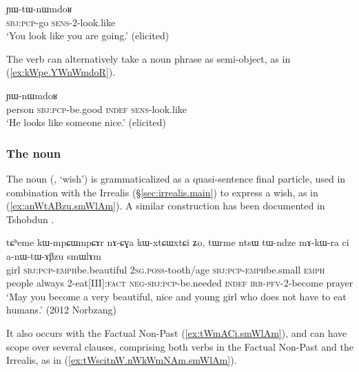 \begin{exe}
	\ex \label{ex:kWCe.YWtWnWmdoR}
	\gll [kɯ-ɕe] ɲɯ-tɯ-nɯmdoʁ \\
	\textsc{sbj}:\textsc{pcp}-go \textsc{sens}-2-look.like \\
	\glt `You look like you are going.' (elicited)
\end{exe}  

The verb  can alternatively take a noun phrase as semi-object, as in (\ref{ex:kWpe.YWnWmdoR}).


\begin{exe}
	\ex \label{ex:kWpe.YWnWmdoR}
	\gll [tɯrme kɯ-pe ci] ɲɯ-nɯmdoʁ \\
	person \textsc{sbj}:\textsc{pcp}-be.good \textsc{indef} \textsc{sens}-look.like \\
	\glt `He looks like someone nice.' (elicited)
\end{exe}  



\subsubsection{The noun  } \label{sec:smWlAm.TAME}
The noun  (, `wish') is grammaticalized as a quasi-sentence final particle, used in combination with the Irrealis (§\ref{sec:irrealis.main}) to express a wish, as in (\ref{ex:anWtABzu.smWlAm}). A similar construction has been documented in Tshobdun \citep{jackson07irrealis}.

\begin{exe}
	\ex \label{ex:anWtABzu.smWlAm}
	\gll tɕʰeme kɯ-mpɕɯ\redp{}mpɕɤr nɤ-ɕɣa kɯ-xtɕɯ\redp{}xtɕi ʑo, tɯrme ntsɯ tɯ-ndze mɤ-kɯ-ra ci a-nɯ-tɯ-ɤβzu smɯlɤm \\
	girl \textsc{sbj}:\textsc{pcp}-\textsc{emph}\redp{}be.beautiful   \textsc{2sg}.\textsc{poss}-tooth/age  \textsc{sbj}:\textsc{pcp}-\textsc{emph}\redp{}be.small \textsc{emph}  people always 2-eat[III]:\textsc{fact} \textsc{neg}-\textsc{sbj}:\textsc{pcp}-be.needed \textsc{indef} \textsc{irr}-\textsc{pfv}-2-become prayer \\
	\glt `May you become a very beautiful, nice and young girl who does not have to eat humans.' (2012 Norbzang)
\end{exe}

It also occurs with the Factual Non-Past (\ref{ex:tWmACi.smWlAm}), and can have scope over several clauses, comprising both verbs in the Factual Non-Past and the Irrealis, as in (\ref{ex:tWscitnW.nWkWmNAm.smWlAm}).

